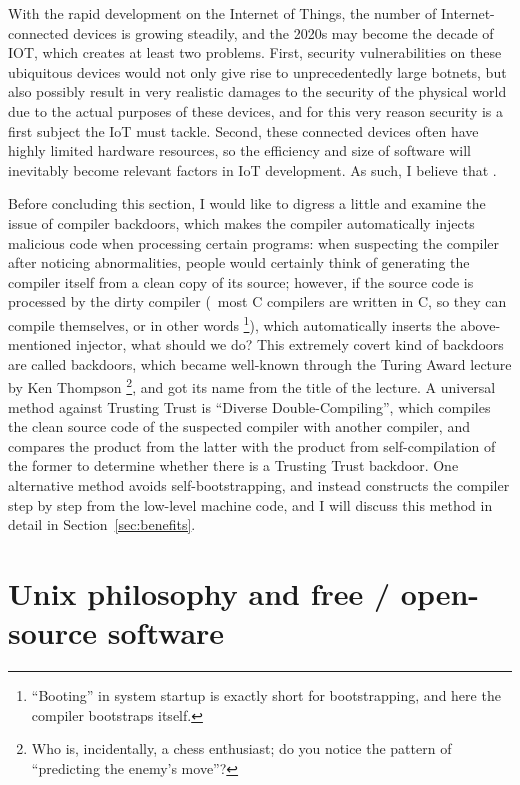 With the rapid development on the Internet of Things, the number of
Internet-connected devices is growing steadily, and the 2020s may become
the decade of IOT, which creates at least two problems.  First, security
vulnerabilities on these ubiquitous devices would not only give rise to
unprecedentedly large botnets, but also possibly result in very realistic
damages to the security of the physical world due to the actual purposes of
these devices, and for this very reason security is a first subject the IoT must
tackle.  Second, these connected devices often have highly limited hardware
resources, so the efficiency and size of software will inevitably become
relevant factors in IoT development.  As such, I believe that .

Before concluding this section, I would like to digress a little and examine
the issue of compiler backdoors, which makes the compiler automatically injects
malicious code when processing certain programs: when suspecting the compiler
after noticing abnormalities, people would certainly think of generating the
compiler itself from a clean copy of its source; however, if the source code
is processed by the dirty compiler (\eg~most C compilers are written in C,
so they can compile themselves, or in other words %
\footnote{``Booting'' in system startup is exactly short for bootstrapping,
and here the compiler bootstraps itself.}), which automatically inserts the
above-mentioned injector, what should we do?  This extremely covert kind of
backdoors are called  backdoors, which became well-known
through the Turing Award lecture by Ken Thompson%
\footnote{Who is, incidentally, a chess enthusiast; do you notice the
pattern of ``predicting the enemy's move''?}, and got its name from the
title of the lecture.  A universal method against Trusting Trust is ``Diverse
Double-Compiling'', which compiles the clean source code
of the suspected compiler with another compiler, and compares the product from
the latter with the product from self-compilation of the former to determine
whether there is a Trusting Trust backdoor.  One alternative method avoids
self-bootstrapping, and instead constructs the compiler step by step from
the low-level machine code, and I will
discuss this method in detail in Section~\ref{sec:benefits}.

\section{Unix philosophy and free / open-source software}\label{sec:foss}

